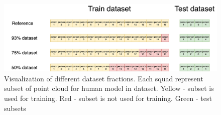 \begin{figure}[htbp]
    \centerline{
            \includegraphics[scale=.13]{Figures/dataset-split.png}}
    \caption{Visualization of different dataset fractions. Each squad represent subset of point cloud for human model in dataset. Yellow - subset is used for training. Red - subset is not used for training. Green - test subsets}
    \label{img:dataset-split}
\end{figure}

